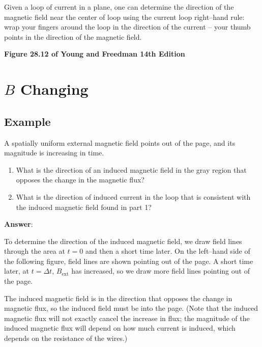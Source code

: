 \documentclass{article}
\begin{document}
Given a loop of current in a plane, one can determine the direction of the magnetic field near the center of loop using the current loop right--hand rule: wrap your fingers around the loop in the direction of the current -- your thumb points in the direction of the magnetic field.



\textbf{Figure 28.12 of Young and Freedman 14th Edition}

\newpage

\section{$B$ Changing}

\subsection{Example}

A spatially uniform external magnetic field points out of the page, and its magnitude is increasing in time.



\begin{enumerate}

  \item What is the direction of an induced magnetic field in the gray region that opposes the change in the magnetic flux?

  \item What is the direction of induced current in the loop that is consistent with the induced magnetic field found in part 1?

\end{enumerate}

{\bf Answer}:

To determine the direction of the induced magnetic field, we draw field lines through the area at $t=0$ and then a short time later. On the left--hand side of the following figure, field lines are shown pointing out of the page. A short time later, at $t=\Delta t$, $B_{\text{ext}}$ has increased, so we draw more field lines pointing out of the page.

The induced magnetic field is in the direction that opposes the change in magnetic flux, so the induced field must be into the page. (Note that the induced magnetic flux will not exactly cancel the increase in flux; the magnitude of the induced magnetic flux will depend on how much current is induced, which depends on the resistance of the wires.)
\end{document}
